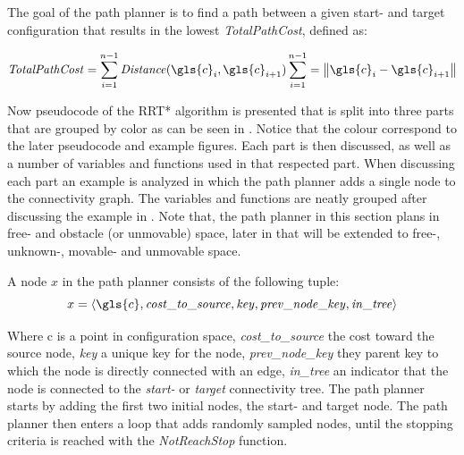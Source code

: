 The goal of the path planner is to find a path between a given start- and target configuration that results in the lowest \textit{TotalPathCost}, defined as:\bs

\[\mathit{TotalPathCost} = \sum_{i=1}^{n-1} \mathit{Distance}(\gls{c}_i, \gls{c}_{i+1}) \sum_{i=1}^{n-1} = \left\|\gls{c}_i-\gls{c}_{i+1}\right\|\]

Now pseudocode of the \ac{RRT*} algorithm is presented that is split into three parts that are grouped by color as can be seen in . Notice that the colour correspond to the later pseudocode and example figures. Each part is then discussed, as well as a number of variables and functions used in that respected part. When discussing each part an example is analyzed in which the path planner adds a single node to the connectivity graph. The variables and functions are neatly grouped after discussing the example in . Note that, the path planner in this section plans in free- and obstacle (or unmovable) space, later in  that will be extended to free-, unknown-, movable- and unmovable space.\bs

A node $x$ in the path planner consists of the following tuple:\bs
\[x = \left\langle \gls{c}, \mathit{cost\_to\_source}, \mathit{key}, \mathit{prev\_node\_key}, \mathit{in\_tree} \right\rangle\]

Where \gls{c} is a point in configuration space, \textit{cost\_to\_source} the cost toward the source node, \textit{key} a unique key for the node, \textit{prev\_node\_key} they parent key to which the node is directly connected with an edge, \textit{in\_tree} an indicator that the node is connected to the \textit{start-} or \textit{target} connectivity tree. The path planner starts by adding the first two initial nodes, the start- and target node. The path planner then enters a loop that adds randomly sampled nodes, until the stopping criteria is reached with the \textit{NotReachStop} function.\bs

